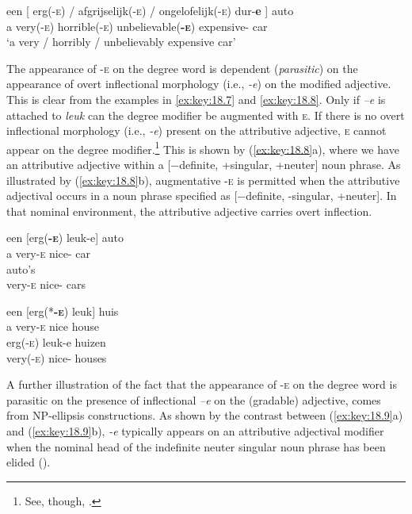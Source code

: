 \documentclass[output=paper]{langsci/langscibook}
\begin{document}
\ea%
    \label{ex:key:18.6}
    \sn
    \gll een  [ erg(-\textsc{e})  /  afgrijselijk(\textsc{-e})  /  ongelofelijk(\textsc{-e})    dur-\textbf{e} ]                  auto\\
    a  {}    very(-\textsc{e})  {}  horrible(-\textsc{e})  {}  unbelievable(\textbf{\textsc{-e}})  expensive-\Agr{} {} car \\
    \glt ‘a very / horribly / unbelievably expensive car’
\z

The appearance of \textsc{-e} on the degree word is dependent
(\emph{parasitic}) on the appearance of overt inflectional morphology (i.e.,
\emph{-e}) on the modified adjective. This is clear from the examples in
\eqref{ex:key:18.7} and \eqref{ex:key:18.8}. Only if \emph{–e} is attached to \emph{leuk}
can the degree modifier be augmented with \textsc{e}. If there is no overt
inflectional morphology (i.e., \emph{-e}) present on the attributive adjective,
\textsc{e} cannot appear on the degree modifier.\footnote{See, though,
.} This is shown by (\ref{ex:key:18.8}a), where we have an
attributive adjective within a [−definite, +singular, +neuter] noun phrase. As
illustrated by (\ref{ex:key:18.8}b), augmentative \textsc{-e} is permitted when the
attributive adjectival occurs in a noun phrase specified as [−definite,
-singular, +neuter]. In that nominal environment, the attributive adjective
carries overt inflection.

\ea%
    \label{ex:key:18.7}
	\ea
	\gll een  [erg(\textbf{\textsc{-e}})    leuk-e]      auto\\
	         a      very-\textsc{e}      nice-\Agr{}    car \\
	    \glt
	\ex
	      auto's\\
		very-\textsc{e}    nice-\Agr{}    cars\\
	\glt
	\z
\z

\ea%
    \label{ex:key:18.8}
	\ea
	\gll een  [erg(*\textbf{\textsc{-e}})    leuk]    huis\\
	        a        very-\textsc{e}        nice      house\\
	    \glt
	\ex
	\gll erg(\textsc{-e})      leuk-e        huizen\\
		very(\textsc{-e)}    nice-\Agr{}    houses\\
	\glt
	\z
\z

A further illustration of the fact that the appearance of \textsc{-e} on the
degree word is parasitic on the presence of inflectional \emph{–e} on the
(gradable) adjective, comes from NP-ellipsis constructions. As shown by the
contrast between (\ref{ex:key:18.9}a) and (\ref{ex:key:18.9}b), \emph{-e} typically
appears on an attributive adjectival modifier when the nominal head of the
indefinite neuter singular noun phrase has been elided
(\citealt{Kester1996,CorvervanKoppen2011}).\newpage
\end{document}
